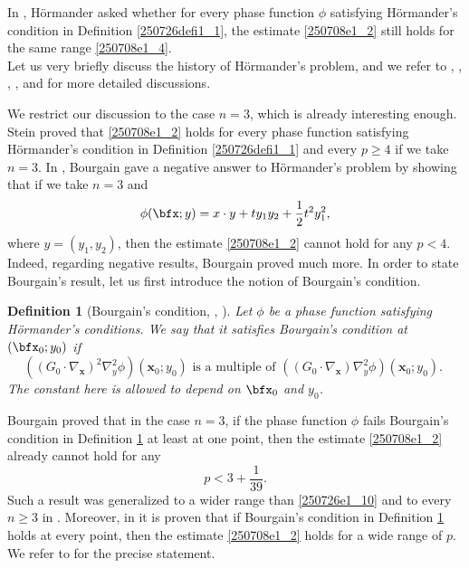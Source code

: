 \documentclass{article}
\numberwithin{equation}{section}
\theoremstyle{plain}
\newtheorem{definition}[theorem]{Definition}
\begin{document}
In \cite{Hor73}, H\"ormander asked whether for every phase function $\phi$ satisfying H\"ormander's condition in Definition \ref{250726defi1_1}, the estimate 
\eqref{250708e1_2} still holds for the same range \eqref{250708e1_4}. \\


Let us very briefly discuss the history of H\"ormander's problem, and we refer to \cite{GHI19}, \cite{HI22}, \cite{GWZ24}, \cite{DGGZ24}, \cite{CGGHIW24} and \cite{nadjimzadah2025newcurvedkakeyaestimates} for more detailed discussions. 





We restrict our discussion to the case $n=3$, which is already interesting enough. Stein \cite{Ste84} proved that \eqref{250708e1_2} holds for every phase function satisfying H\"ormander's condition in Definition \ref{250726defi1_1} and every $p\ge 4$ if we take $n=3$. 
In \cite{Bou91}, Bourgain gave a negative answer to H\"ormander's problem by showing that if we take $n=3$ and  
\begin{equation}\label{250801e1_8}
\phi(\bfx; y)= x\cdot y+ ty_1 y_2+ \frac12 t^2 y_1^2,
\end{equation}
where $y=(y_1, y_2)$, then the estimate \eqref{250708e1_2} cannot hold for any $p<4$. Indeed, regarding negative results, Bourgain  \cite{Bou91} proved much more. In order to state Bourgain's result, let us first introduce the notion of Bourgain's condition. 


\begin{definition}[Bourgain's condition, \cite{Bou91}, \cite{GWZ24}]\label{230903definition1_4}
 Let $\phi$ be a phase function satisfying H\"ormander's conditions. We say that it satisfies Bourgain's condition at $(\bfx_0; y_0)$ if 
\begin{equation}\label{230719e1_9}
\left(\left(G_0 \cdot \nabla_{\mathbf{x}}\right)^2 \nabla_{y}^2 \phi\right)\left(\mathbf{x}_0 ; y_0\right) \text { is a multiple of }\left(\left(G_0 \cdot \nabla_{\mathbf{x}}\right) \nabla_{y}^2 \phi\right)\left(\mathbf{x}_0 ; y_0\right) \text {. }
\end{equation}
The constant here is allowed to depend on $\bfx_0$ and $y_0$. 
\end{definition}



Bourgain \cite{Bou91} proved that in the case $n=3$, if the phase function $\phi$ fails Bourgain's condition in Definition \ref{230903definition1_4} at least at one point, then the estimate \eqref{250708e1_2} already cannot hold for any 
\begin{equation}\label{250726e1_10}
p< 3+ \frac{1}{39}.
\end{equation}
Such a result was generalized to a wider range than \eqref{250726e1_10} and to every $n\ge 3$ in \cite{GWZ24}. Moreover,  in \cite{GWZ24} it is proven that if Bourgain's condition in Definition \ref{230903definition1_4} holds at every point, then the estimate \eqref{250708e1_2} holds for a wide range of $p$. We refer to \cite{GWZ24} for the precise statement. \\
\end{document}
